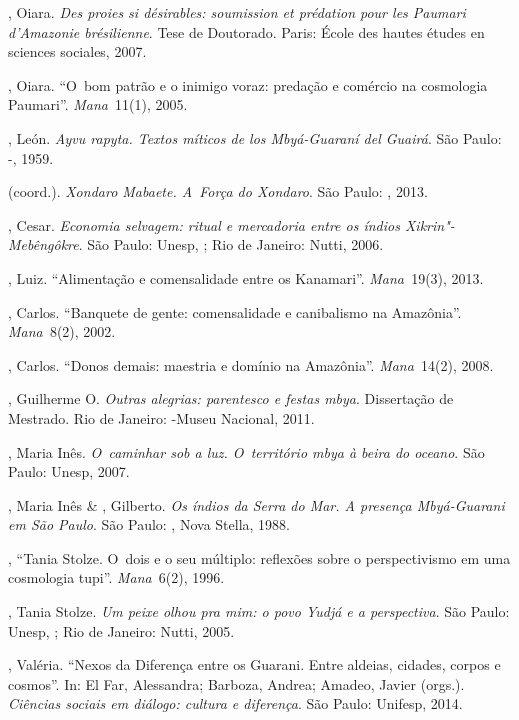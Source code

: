 \begin{Parskip}
, Oiara. \emph{Des proies si désirables: soumission et prédation pour
les Paumari d’Amazonie br\'{e}silienne}. Tese de Doutorado. Paris:
École des hautes études en sciences sociales, 2007.

, Oiara. ``O~bom patrão e o inimigo voraz: predação e comércio na
cosmologia Paumari''. \emph{Mana~}11(1), 2005.

, León. \emph{Ayvu rapyta. Textos míticos de los Mbyá-Guaraní del
Guairá}. São Paulo: -, 1959.

    (coord.). \emph{Xondaro Mabaete. A~Força do
Xondaro}. São Paulo: , 2013.

, Cesar. \emph{Economia selvagem: ritual e mercadoria entre os índios
Xikrin"-Mebêngôkre}. São Paulo: Unesp, ; Rio de Janeiro: Nutti, 2006.

, Luiz. ``Alimentação e comensalidade entre os Kanamari''. \emph{Mana~}19(3),
2013.

, Carlos. ``Banquete de gente: comensalidade e canibalismo na
Amazônia''. \emph{Mana~}8(2), 2002.

, Carlos. ``Donos demais: maestria e domínio na Amazônia''. \emph{Mana~}14(2),
2008.

, Guilherme O. \emph{Outras alegrias: parentesco e festas mbya}.
Dissertação de Mestrado. Rio de Janeiro: -Museu Nacional, 2011.

, Maria Inês. \emph{O~caminhar sob a luz. O~território mbya à beira do
oceano}. São Paulo: Unesp, 2007.

, Maria Inês \& , Gilberto. \emph{Os índios da Serra do Mar. A
presença Mbyá-Guarani em São Paulo}. São Paulo: , Nova Stella, 1988.

, ``Tania Stolze. O~dois e o seu múltiplo: reflexões sobre o
perspectivismo em uma cosmologia tupi''. \emph{Mana~}6(2), 1996.

, Tania Stolze. \emph{Um peixe olhou pra mim: o povo Yudjá e a
perspectiva}. São Paulo: Unesp, ; Rio de Janeiro: Nutti, 2005.

, Valéria. ``Nexos da Diferença entre os Guarani. Entre
aldeias, cidades, corpos e cosmos''. In: El Far, Alessandra; Barboza,
Andrea; Amadeo, Javier (orgs.). \emph{Ciências sociais em diálogo: cultura e diferença}. São Paulo: Unifesp, 2014.


\end{Parskip}
